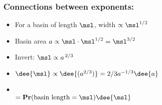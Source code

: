 
\begin{frame}
  \frametitle{Connections between exponents:}

  \begin{block}{}
  \begin{itemize}
  \item<+->   
    For a basin of length $\msl$, width $\propto \msl^{1/2}$
  \item<+->   
    Basin area $a \propto \msl\cdot \msl^{1/2} = \msl^{3/2}$
  \item<+->   
    Invert: $ \msl \propto a^{\, 2/3} $
  \item<+->   
    $ \dee{\msl} \propto \dee{(a^{2/3})} = 2/3 a^{-1/3} \dee{a} $
  \item<+->  
    \\
    $
    =
    \mathbf{Pr}(\mbox{basin length} = \msl) \dee{\msl}
    $\\
  \end{itemize}
  \end{block}

\end{frame}

